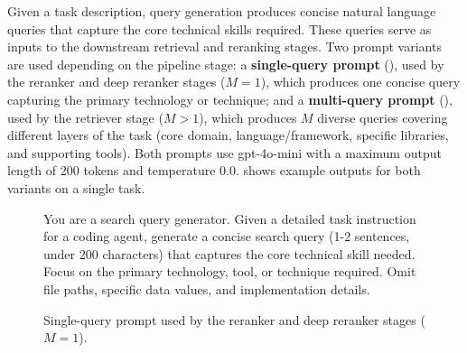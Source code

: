 \documentclass[11pt]{article}
\begin{document}
Given a task description, query generation produces concise natural language queries that capture the core technical skills required.
These queries serve as inputs to the downstream retrieval and reranking stages.
Two prompt variants are used depending on the pipeline stage: a \textbf{single-query prompt} (), used by the reranker and deep reranker stages ($M = 1$), which produces one concise query capturing the primary technology or technique; and a \textbf{multi-query prompt} (), used by the retriever stage ($M > 1$), which produces $M$ diverse queries covering different layers of the task (core domain, language/framework, specific libraries, and supporting tools).
Both prompts use gpt-4o-mini \citep{hurst2024gpt} with a maximum output length of 200 tokens and temperature 0.0.
 shows example outputs for both variants on a single task.

\begin{figure}[t]
\begin{tcolorbox}[title=Single-Query Prompt, colback=gray!5, colframe=gray!50, fonttitle=\bfseries\small, fontupper=\small\ttfamily\raggedright]
You are a search query generator. Given a detailed task instruction for a coding agent, generate a concise search query (1-2 sentences, under 200 characters) that captures the core technical skill needed. Focus on the primary technology, tool, or technique required. Omit file paths, specific data values, and implementation details.
\end{tcolorbox}
\caption{Single-query prompt used by the reranker and deep reranker stages ($M = 1$).}
\label{box:single_query_prompt}
\end{figure}
\end{document}
